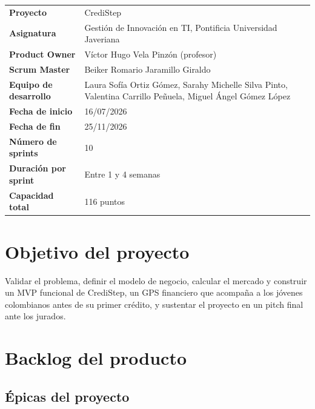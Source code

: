 \documentclass[11pt,a4paper]{article}
\begin{document}
\begin{tabularx}{\textwidth}{>{\bfseries}l X}
  \toprule
  Proyecto             & CrediStep \\
  Asignatura           & Gestión de Innovación en TI, Pontificia Universidad Javeriana \\
  Product Owner        & Víctor Hugo Vela Pinzón (profesor) \\
  Scrum Master         & Beiker Romario Jaramillo Giraldo \\
  Equipo de desarrollo & Laura Sofía Ortiz Gómez, Sarahy Michelle Silva Pinto, Valentina Carrillo Peñuela, Miguel Ángel Gómez López \\
  Fecha de inicio      & 16/07/2026 \\
  Fecha de fin         & 25/11/2026 \\
  Número de sprints    & 10 \\
  Duración por sprint  & Entre 1 y 4 semanas \\
  Capacidad total      & 116 puntos \\
  \bottomrule
\end{tabularx}

\section{Objetivo del proyecto}

\begin{objetivo}
  Validar el problema, definir el modelo de negocio, calcular el mercado y construir un MVP funcional de CrediStep, un GPS financiero que acompaña a los jóvenes colombianos antes de su primer crédito, y sustentar el proyecto en un pitch final ante los jurados.
  
\end{objetivo}

\section{Backlog del producto}

\subsection{Épicas del proyecto}
\end{document}
